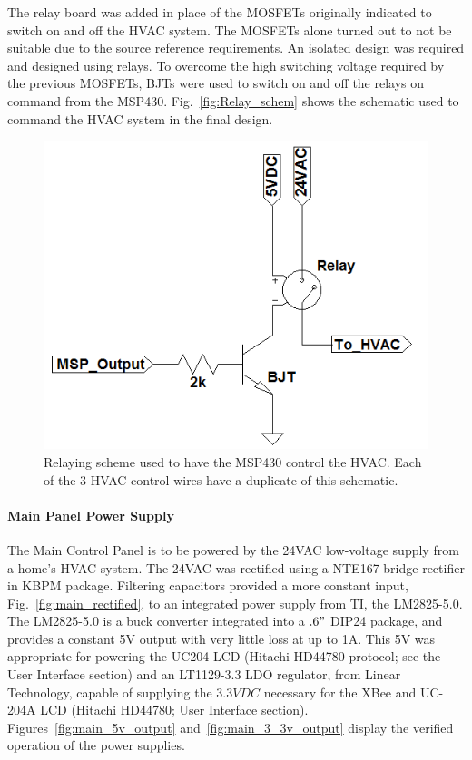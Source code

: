 The relay board was added in place of the MOSFETs originally indicated to switch on and off the HVAC system.  The MOSFETs alone turned out to not be suitable due to the source reference requirements.  An isolated design was required and designed using relays.  To overcome the high switching voltage required by the previous MOSFETs, BJTs were used to switch on and off the relays on command from the MSP430.  Fig.~\ref{fig:Relay_schem} shows the schematic used to command the HVAC system in the final design.

\begin{figure}[htbp]
\centering
\includegraphics[width=.99\textwidth]{Relay_schem.png}
\caption{Relaying scheme used to have the MSP430 control the HVAC. Each of the 3 HVAC control wires have a duplicate of this schematic.}
\end{figure}

\paragraph{Main Panel Power Supply}
The Main Control Panel is to be powered by the 24VAC low-voltage supply from a home's HVAC system. The 24VAC was rectified using a NTE167 bridge rectifier in KBPM package.  Filtering capacitors provided a more constant input, Fig.~\ref{fig:main_rectified}, to an integrated power supply from TI, the LM2825-5.0.  The LM2825-5.0 is a buck converter integrated into a $.6"$ DIP24 package, and provides a constant 5V output with very little loss at up to 1A.  This 5V was appropriate for powering the UC204 LCD (Hitachi HD44780 protocol; see the User Interface section) and an LT1129-3.3 LDO regulator, from Linear Technology, capable of supplying the $3.3VDC$ necessary for the XBee and UC-204A LCD (Hitachi HD44780; User Interface section). Figures~\ref{fig:main_5v_output} and~\ref{fig:main_3_3v_output} display the verified operation of the power supplies.

